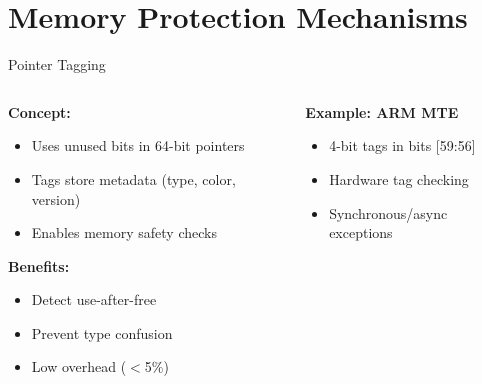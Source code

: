 \documentclass[aspectratio=169,12pt]{beamer}
\begin{document}
\section{Memory Protection Mechanisms}

\begin{frame}{Pointer Tagging}
    \begin{columns}
        \begin{column}{0.5\textwidth}
            \textbf{Concept:}
            \begin{itemize}
                \item Uses unused bits in 64-bit pointers
                \item Tags store metadata (type, color, version)
                \item Enables memory safety checks
            \end{itemize}
            
            \vspace{0.5cm}
            \textbf{Benefits:}
            \begin{itemize}
                \item Detect use-after-free
                \item Prevent type confusion
                \item Low overhead ($<$5\%)
            \end{itemize}
        \end{column}
        \begin{column}{0.5\textwidth}
            
            \vspace{0.5cm}
            \textbf{Example: ARM MTE}
            \begin{itemize}
                \item 4-bit tags in bits [59:56]
                \item Hardware tag checking
                \item Synchronous/async exceptions
            \end{itemize}
        \end{column}
    \end{columns}
\end{frame}
\end{document}
